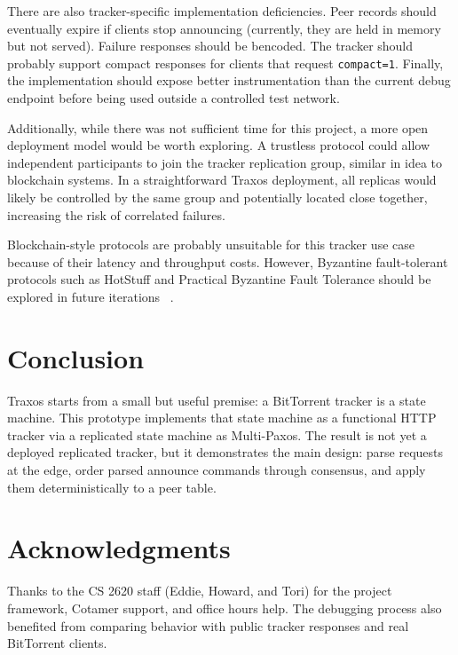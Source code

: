 \documentclass[letterpaper,twocolumn,10pt]{article}
\begin{document}
There are also tracker-specific implementation deficiencies. Peer records
should eventually expire if clients stop announcing (currently, they are held
in memory but not served). Failure responses should be bencoded. The tracker
should probably support compact responses for clients that request
\texttt{compact=1}. Finally, the implementation should expose better
instrumentation than the current debug endpoint before being used outside a
controlled test network.

Additionally, while there was not sufficient time for this project, a more
open deployment model would be worth exploring. A trustless protocol could
allow independent participants to join the tracker replication group,
similar in idea to blockchain systems. In a straightforward Traxos
deployment, all replicas would likely be controlled by the same group and
potentially located close together, increasing the risk of correlated
failures.

Blockchain-style protocols are probably unsuitable for this tracker use
case because of their latency and throughput costs. However, Byzantine
fault-tolerant protocols such as HotStuff and Practical Byzantine Fault
Tolerance should be explored in future iterations ~\cite{hotstuff,pbft}.

\section{Conclusion}

Traxos starts from a small but useful premise: a BitTorrent tracker is a state
machine. This prototype implements that state machine as a functional HTTP
tracker via a replicated state machine as Multi-Paxos. The result is not yet a
deployed replicated tracker, but it demonstrates the main design: parse
requests at the edge, order parsed announce commands through consensus, and
apply them deterministically to a peer table.

\section*{Acknowledgments}

Thanks to the CS 2620 staff (Eddie, Howard, and Tori) for the project
framework, Cotamer support, and office hours help. The debugging process also
benefited from comparing behavior with public tracker responses and real
BitTorrent clients.
\end{document}
